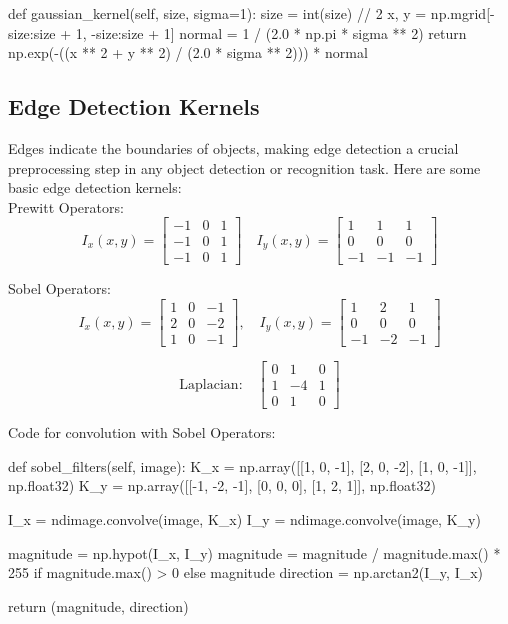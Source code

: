 \documentclass{article}
\begin{document}
	\begin{python}
def gaussian_kernel(self, size, sigma=1):
	size = int(size) // 2
	x, y = np.mgrid[-size:size + 1, -size:size + 1]
	normal = 1 / (2.0 * np.pi * sigma ** 2)
	return np.exp(-((x ** 2 + y ** 2) / (2.0 * sigma ** 2))) * normal\end{python}
	
	\subsection{Edge Detection Kernels}
	
	Edges indicate the boundaries of objects, making edge detection a crucial preprocessing step in any object detection or recognition task. Here are some basic edge detection kernels: \\
	
	Prewitt Operators:
	$$I_x(x,y) = \begin{bmatrix} -1 & 0 & 1 \\ -1 & 0 & 1 \\ -1 & 0 & 1 \end{bmatrix} \quad I_y(x,y) = \begin{bmatrix} 1 & 1 & 1 \\ 0 & 0 & 0 \\ -1 & -1 & -1 \end{bmatrix}$$
	
	Sobel Operators:
	$$I_x(x,y) = \begin{bmatrix} 1 & 0 & -1 \\ 2 & 0 & -2 \\ 1 & 0 & -1 \end{bmatrix}, \quad I_y(x,y) = \begin{bmatrix} 1 & 2 & 1 \\ 0 & 0 & 0 \\ -1 & -2 & -1 \end{bmatrix}$$
	
	$$\text{Laplacian:} \quad \begin{bmatrix} 0 & 1 & 0 \\ 1 & -4 & 1 \\ 0 & 1 & 0 \end{bmatrix}$$
	
	Code for convolution with Sobel Operators:
	
	\begin{python}
def sobel_filters(self, image):
	K_x = np.array([[1, 0, -1], [2, 0, -2], [1, 0, -1]], np.float32)
	K_y = np.array([[-1, -2, -1], [0, 0, 0], [1, 2, 1]], np.float32)
	
	I_x = ndimage.convolve(image, K_x)
	I_y = ndimage.convolve(image, K_y)
	
	magnitude = np.hypot(I_x, I_y)
	magnitude = magnitude / magnitude.max() * 255 if magnitude.max() > 0 else magnitude
	direction = np.arctan2(I_y, I_x)
	
	return (magnitude, direction)\end{python}
	
\end{document}
